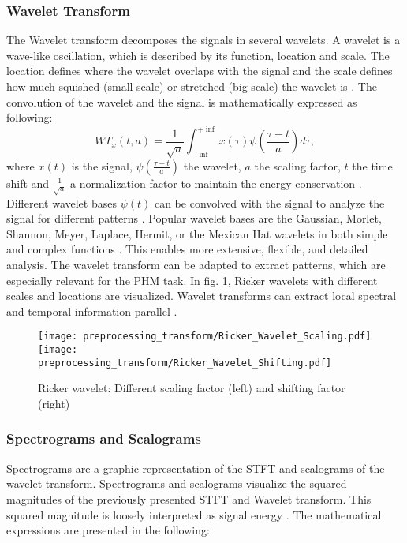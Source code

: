 \subsubsection{Wavelet Transform}
The Wavelet transform decomposes the signals in several wavelets. A wavelet is a wave-like oscillation, which is described by its function, location and scale. The location defines where the wavelet overlaps with the signal and the scale defines how much squished (small scale) or stretched (big scale) the wavelet is \cite{Sifuzzaman2009}. The convolution of the wavelet and the signal is mathematically expressed as following:
\begin{equation}
    WT_{x}(t,a) = \frac{1}{\sqrt{a}} \int_{- \inf}^{+ \inf} x(\tau) \psi(\frac{\tau -t}{a}) d \tau,
\end{equation}
 where $x(t)$ is the signal, $\psi(\frac{\tau -t}{a})$ the wavelet, $a$ the scaling factor, $t$ the time shift and $\frac{1}{\sqrt{a}}$ a normalization factor to maintain the energy conservation \cite{FENG2013}. Different wavelet bases $\psi(t)$ can be convolved with the signal to analyze the signal for different patterns \cite{Sifuzzaman2009}. Popular wavelet bases are the Gaussian, Morlet, Shannon, Meyer, Laplace, Hermit, or the Mexican Hat wavelets in both simple and complex functions \cite{Verstraete2017}. This enables more extensive, flexible, and detailed analysis. The wavelet transform can be adapted to extract patterns, which are especially relevant for the PHM task. In fig. \ref{fig:ricker_wavelet}, Ricker wavelets with different scales and locations are visualized. Wavelet transforms can extract local spectral and temporal information parallel \cite{Sifuzzaman2009}.


\begin{figure}[H]
  \centering
  \texttt{[image: preprocessing\_transform/Ricker\_Wavelet\_Scaling.pdf]}
  \hspace{.1cm}
  \texttt{[image: preprocessing\_transform/Ricker\_Wavelet\_Shifting.pdf]}
  

  \caption{Ricker wavelet: Different scaling factor (left) and shifting factor (right)}
  \label{fig:ricker_wavelet}
\end{figure}

\subsubsection{Spectrograms and Scalograms}

 Spectrograms are a graphic representation of the STFT and scalograms of the wavelet transform. Spectrograms and scalograms visualize the squared magnitudes of the previously presented STFT and Wavelet transform. This squared magnitude is loosely interpreted as signal energy \cite{Hlawatsch1992}. The mathematical expressions are presented in the following: 

